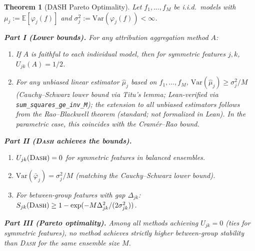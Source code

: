 \documentclass{article}
\newtheorem{theorem}{Theorem}
\newcommand{\E}{\mathbb{E}}
\newcommand{\Var}{\mathrm{Var}}
\newcommand{\DASH}{\textsc{Dash}}
\begin{document}
\begin{theorem}[DASH Pareto Optimality]
\label{thm:dash-optimal}
Let $f_1, \ldots, f_M$ be i.i.d.\ models with $\mu_j := \E[\varphi_j(f)]$ and $\sigma_j^2 := \Var(\varphi_j(f)) < \infty$.

\textbf{Part I (Lower bounds).}
For any attribution aggregation method $A$:
\begin{enumerate}
    \item[(a)] If $A$ is faithful to each individual model, then for symmetric features $j, k$, $U_{jk}(A) = 1/2$.
    \item[(b)] For any unbiased \emph{linear} estimator $\hat\mu_j$ based on $f_1, \ldots, f_M$, $\Var(\hat\mu_j) \geq \sigma_j^2 / M$ (Cauchy--Schwarz lower bound via Titu's lemma; Lean-verified via \texttt{sum\_squares\_ge\_inv\_M}); the extension to all unbiased estimators follows from the Rao--Blackwell theorem (standard; not formalized in Lean). In the parametric case, this coincides with the Cram\'er--Rao bound.
\end{enumerate}

\textbf{Part II (\DASH{} achieves the bounds).}
\begin{enumerate}
    \item[(c)] $U_{jk}(\text{\DASH{}}) = 0$ for symmetric features in balanced ensembles.
    \item[(d)] $\Var(\bar\varphi_j) = \sigma_j^2 / M$ (matching the Cauchy--Schwarz lower bound).
    \item[(e)] For between-group features with gap $\Delta_{jk}$: $S_{jk}(\text{\DASH{}}) \geq 1 - \exp(-M\Delta_{jk}^2 / (2\sigma_{jk}^2))$.
\end{enumerate}

\textbf{Part III (Pareto optimality).}
Among all methods achieving $U_{jk} = 0$ (ties for symmetric features), no method achieves strictly higher between-group stability than \DASH{} for the same ensemble size $M$.
\end{theorem}
\end{document}
